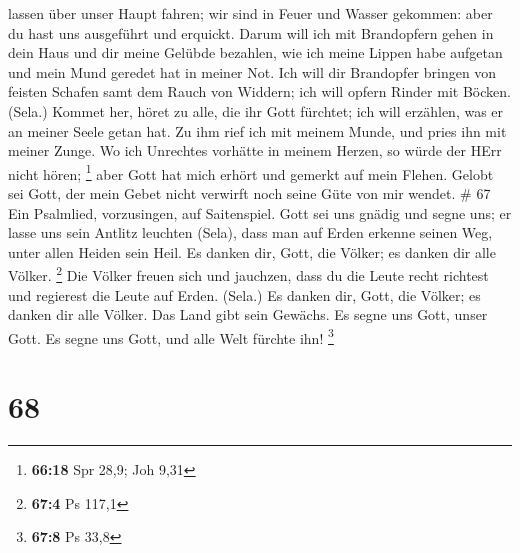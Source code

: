 lassen über unser Haupt fahren; wir sind in Feuer und Wasser gekommen:
aber du hast uns ausgeführt und erquickt.  Darum will ich
mit Brandopfern gehen in dein Haus und dir meine Gelübde bezahlen,
 wie ich meine Lippen habe aufgetan und mein Mund geredet
hat in meiner Not.  Ich will dir Brandopfer bringen von
feisten Schafen samt dem Rauch von Widdern; ich will opfern Rinder mit
Böcken. (Sela.)  Kommet her, höret zu alle, die ihr Gott
fürchtet; ich will erzählen, was er an meiner Seele getan hat.
 Zu ihm rief ich mit meinem Munde, und pries ihn mit meiner
Zunge.  Wo ich Unrechtes vorhätte in meinem Herzen, so
würde der HErr nicht hören; \footnote{\textbf{66:18} Spr 28,9; Joh 9,31}
 aber Gott hat mich erhört und gemerkt auf mein Flehen.
 Gelobt sei Gott, der mein Gebet nicht verwirft noch seine
Güte von mir wendet. \# 67  Ein Psalmlied, vorzusingen, auf
Saitenspiel.  Gott sei uns gnädig und segne uns; er lasse
uns sein Antlitz leuchten (Sela),  dass man auf Erden
erkenne seinen Weg, unter allen Heiden sein Heil.  Es danken
dir, Gott, die Völker; es danken dir alle Völker. \footnote{\textbf{67:4}
  Ps 117,1}  Die Völker freuen sich und jauchzen, dass du
die Leute recht richtest und regierest die Leute auf Erden. (Sela.)
 Es danken dir, Gott, die Völker; es danken dir alle Völker.
 Das Land gibt sein Gewächs. Es segne uns Gott, unser Gott.
 Es segne uns Gott, und alle Welt fürchte ihn! \footnote{\textbf{67:8}
  Ps 33,8}

\hypertarget{section-25}{%
\section{68}\label{section-25}}


